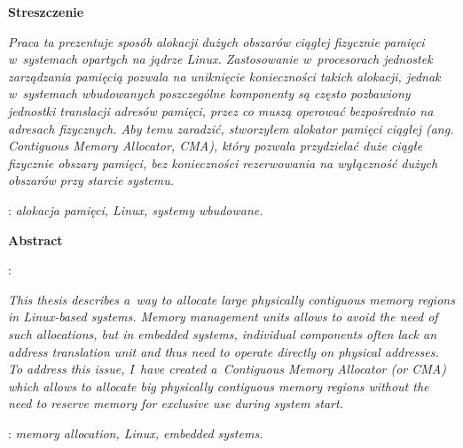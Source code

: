 \begin{titlepage}
    \newpage\thispagestyle{empty}
    \vspace*{2\baselineskip}
    \begin{center}
        {\large\bfseries Streszczenie}\par\bigskip
    \end{center}

    {\itshape Praca ta prezentuje sposób alokacji dużych obszarów
      ciągłej fizycznie pamięci w~systemach opartych na jądrze Linux.
      Zastosowanie w~procesorach jednostek zarządzania pamięcią
      pozwala na uniknięcie konieczności takich alokacji, jednak
      w~systemach wbudowanych poszczególne komponenty są często
      pozbawiony jednostki translacji adresów pamięci, przez co muszą
      operować bezpośrednio na adresach fizycznych.  Aby temu
      zaradzić, stworzyłem alokator pamięci ciągłej (ang. {\it
        Contiguous Memory Allocator}, CMA), który pozwala przydzielać
      duże ciągłe fizycznie obszary pamięci, bez konieczności
      rezerwowania na wyłączność dużych obszarów przy starcie systemu.}
    \vspace*{1\baselineskip}

    : {\itshape alokacja pamięci, Linux,
      systemy wbudowane.}
    \par
    \vspace{4\baselineskip}
    \begin{center}
        {\large\bfseries Abstract}\par\bigskip
    \end{center}
    : {\itshape \theengishtitle}\par
    \vspace*{1\baselineskip}

    {\itshape This thesis describes a~way to allocate large physically
      contiguous memory regions in Linux-based systems.  Memory
      management units allows to avoid the need of such allocations,
      but in embedded systems, individual components often lack an
      address translation unit and thus need to operate directly on
      physical addresses.  To address this issue, I~have created
      a~Contiguous Memory Allocator (or CMA) which allows to allocate
      big physically contiguous memory regions without the need to
      reserve memory for exclusive use during system start.}
    \vspace*{1\baselineskip}

    : {\itshape memory allocation, Linux,
      embedded systems.}

\end{titlepage}
